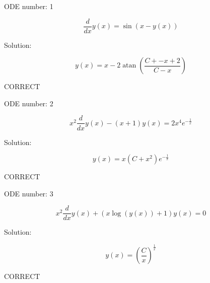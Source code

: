 \documentclass{article}
\begin{document}
        
ODE number: 1

$$
 \frac{d}{d x} y{\left (x \right )} = \sin{\left (x - y{\left (x \right )} \right )} 
$$

Solution:

$$
 y{\left (x \right )} = x - 2 \operatorname{atan}{\left (\frac{C + - x + 2}{C - x} \right )} 
$$

CORRECT

ODE number: 2

$$
 x^{2} \frac{d}{d x} y{\left (x \right )} - \left(x + 1\right) y{\left (x \right )} = 2 x^{4} e^{- \frac{1}{x}} 
$$

Solution:

$$
 y{\left (x \right )} = x \left(C + x^{2}\right) e^{- \frac{1}{x}} 
$$

CORRECT

ODE number: 3

$$
 x^{2} \frac{d}{d x} y{\left (x \right )} + \left(x \log{\left (y{\left (x \right )} \right )} + 1\right) y{\left (x \right )} = 0 
$$

Solution:

$$
 y{\left (x \right )} = \left(\frac{C}{x}\right)^{\frac{1}{x}} 
$$

CORRECT
\end{document}
